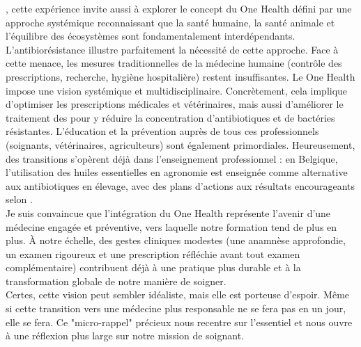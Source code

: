 , cette expérience invite aussi à explorer le concept du One Health défini par une approche systémique reconnaissant que la santé humaine, la santé animale et l'équilibre des écosystèmes sont fondamentalement interdépendants. L’antibiorésistance illustre parfaitement la nécessité de cette approche. Face à cette menace, les mesures traditionnelles de la médecine humaine (contrôle des prescriptions, recherche, hygiène hospitalière) restent insuffisantes. Le One Health impose une vision systémique et multidisciplinaire. Concrètement, cela implique d'optimiser les prescriptions médicales et vétérinaires, mais aussi d'améliorer le traitement des  pour y réduire la concentration d’antibiotiques et de bactéries résistantes. L'éducation et la prévention auprès de tous ces professionnels (soignants, vétérinaires, agriculteurs) sont également primordiales. Heureusement, des transitions s'opèrent déjà dans l'enseignement professionnel : en Belgique, l'utilisation des huiles essentielles \parencite{siep_formation_524} en agronomie est enseignée comme alternative aux antibiotiques en élevage, avec des plans d'actions aux résultats encourageants selon \textcite{celagri_antibioresistance}.\\
Je suis convaincue que l’intégration du One Health représente l’avenir d'une médecine engagée et préventive, vers laquelle notre formation tend de plus en plus. À notre échelle, des gestes cliniques modestes (une anamnèse approfondie, un examen rigoureux et une prescription réfléchie avant tout examen complémentaire) contribuent déjà à une pratique plus durable et à la transformation globale de notre manière de soigner.\\


Certes, cette vision peut sembler idéaliste, mais elle est porteuse d’espoir. Même si cette transition vers une médecine plus responsable ne se fera pas en un jour, elle se fera. Ce "micro-rappel" précieux nous recentre sur l’essentiel et nous ouvre à une réflexion plus large sur notre mission de soignant.